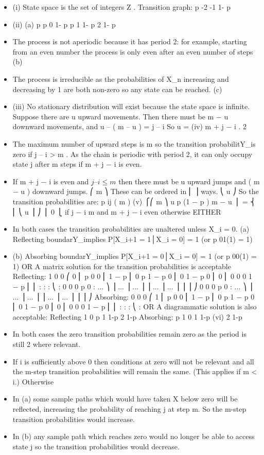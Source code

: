 \documentclass[a4paper,12pt]{article}
\begin{document}
\begin{itemize}
\item (i)
State space is the set of integers Ζ .
Transition graph:
p
-2
-1
1- p
\item (ii)
(a)
p
p
0
1- p
p
1
1- p
2
1- p
\item The process is not aperiodic
because it has period 2:
for example, starting from an even number the process is only even after an even number of steps
(b)
\item The process is irreducible
as the probabilities of X_n increasing and decreasing by 1 are both non-zero so any state can be reached.
(c)
\item (iii)
No stationary distribution will exist because the state space is infinite.
Suppose there are u upward movements.
Then there must be m − u downward movements,
and u – ( m – u ) = j – i
So u =
(iv)
m + j − i
.
2
\item The maximum number of upward steps is m so the transition probabilitY_is zero if j – i > m .
As the chain is periodic with period 2, it can only occupy state j after m steps if m + j − i is even.
\item If m + j − i is even and $j– i \leq m$ then there must be u
upward jumps and ( m − u ) downward jumps.
⎛ m ⎞
These can be ordered in ⎜ ⎟ ways.
⎝ u ⎠
So the transition probabilities are:
p ij ( m )
(v)
⎧⎛ m ⎞ u
p (1 − p ) m − u
⎪
= ⎨ ⎜ ⎝ u ⎟ ⎠
⎪
0
⎩
if j − i \leq m and m + j − i even
otherwise
EITHER
\item In both cases the transition probabilities
are unaltered unless X_i = 0.
(a) Reflecting boundarY_implies
P[X_i+1 = 1│X_i = 0] = 1 (or p 01(1) = 1)
\item (b) Absorbing boundarY_implies
P[X_i+1 = 0│X_i = 0] = 1 (or p 00(1) = 1)
OR
A matrix solution for the transition probabilities is acceptable
Reflecting:
1
0
0
⎛ 0
⎜
p
0
0
⎜ 1 − p
⎜ 0
p
1 − p
0
⎜
0
1 − p
0
⎜ 0
⎜ 0
0
0
1 − p
⎜ ⎜
:
:
:
⎝ :
0
0
0
p
0
: ... ⎞
⎟
... ⎟
... ⎟
⎟
... ⎟
... ⎟
⎟ ⎟
⎠
0
0
0
p
0
: ... ⎞
⎟
... ⎟
... ⎟
⎟
... ⎟
... ⎟
⎟ ⎟
⎠
Absorbing:
0
0
0
⎛ 1
⎜
p
0
0
⎜ 1 − p
⎜ 0
p
1 − p
0
⎜
0
1 − p
0
⎜ 0
⎜ 0
0
0
1 − p
⎜ ⎜
:
:
:
⎝ :
OR
A diagrammatic solution is also acceptable:
Reflecting
1
0
p
1
1-p
2
1-p
Absorbing:
p
1
0
1
1-p
(vi)
2
1-p
\item In both cases the zero transition probabilities remain
zero as the period is still 2 where relevant.
\item If i is sufficiently above 0 then conditions at zero
will not be relevant and all the m-step transition
probabilities will remain the same. (This applies if m < i.)
Otherwise
\item In (a) some sample paths which would have
taken X below zero will be reflected, increasing the
probability of reaching j at step m.
So the m-step transition probabilities would increase.
\item In (b) any sample path which reaches zero would
no longer be able to access state j
so the transition probabilities would decrease.
\end{itemize}
\end{document}
